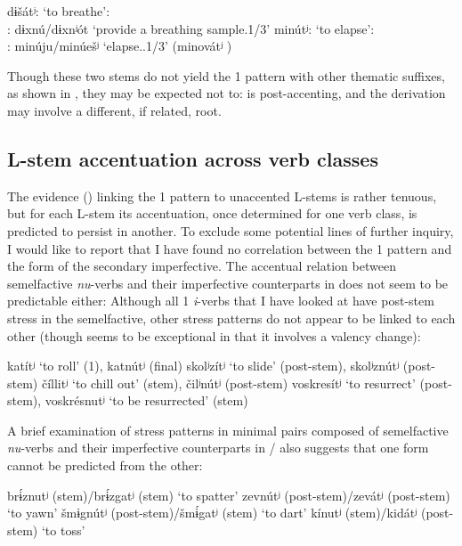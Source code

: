 \documentclass[output=paper,colorlinks,citecolor=black,koreanfont]{langscibook}
\begin{document}
\ea\label{mat:ex:dysatminut} 
\ea\label{mat:ex:dysat} {dɨšátʲ}: ‘to breathe’: \\: {dɨxnú}/{dɨxnʲót} ‘provide a breathing sample.{1\SG}/{3\SG}’
\ex\label{mat:ex:minut} {minútʲ}: ‘to elapse’: \\: {minúju}/{minúešʲ} ‘elapse.{\IPFV}.{1\SG}/{3\SG}’ ({minovátʲ} {\INF})
\z
\z

\noindent Though these two stems do not yield the {1\SG} pattern with other thematic suffixes, as shown in , they may be expected not to:  is post-accenting, and the  derivation may involve a different, if related, root.

\subsection{L-stem accentuation across verb classes}

The evidence () linking the {1\SG} pattern to unaccented L-stems is rather tenuous, but for each L-stem its accentuation, once determined for one verb class, is predicted to persist in another. To exclude some potential lines of further inquiry, I would like to report that I have found no correlation between the {1\SG} pattern and the form of the secondary imperfective. The accentual relation between semelfactive \textit{nu}-verbs and their imperfective counterparts in  does not seem to be predictable either: Although all {1\SG} \textit{i}-verbs that I have looked at have post-stem stress in the semelfactive, other stress patterns do not appear to be linked to each other (though  seems to be exceptional in that it involves a valency change):

\ea
\ea katítʲ ‘to roll’ ({1\SG}), katnútʲ (final)
\ex skolʲzítʲ ‘to slide’ (post-stem), skolʲznútʲ (post-stem)
\ex číllitʲ ‘to chill out’ (stem), čilʲnútʲ (post-stem)
\ex\label{mat:ex:voskresit} voskresítʲ ‘to resurrect’ (post-stem), voskrésnutʲ ‘to be resurrected’ (stem)
\z
\z

\noindent A brief examination of stress patterns in minimal pairs composed of semelfactive \textit{nu}-verbs and their imperfective counterparts in / also suggests that one form cannot be predicted from the other:

\ea
\ea brɨ́znutʲ (stem)/brɨ́zgatʲ (stem) ‘to spatter’
\ex zevnútʲ (post-stem)/zevátʲ (post-stem) ‘to yawn’ 
\ex šmɨgnútʲ (post-stem)/šmɨ́gatʲ (stem) ‘to dart’ 
\ex kínutʲ (stem)/kidátʲ (post-stem) ‘to toss’
\z
\z
\end{document}
